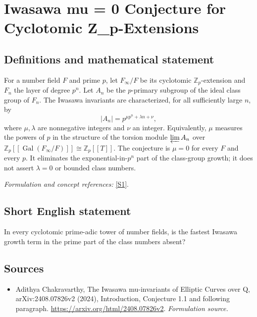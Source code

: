 \documentclass[11pt]{article}
\begin{document}
\section*{\texorpdfstring{Iwasawa mu = 0 Conjecture for Cyclotomic Z\_p-Extensions}{Iwasawa mu = 0 Conjecture for Cyclotomic Z\_p-Extensions}}\label{324}
\subsection{Definitions and mathematical statement}
For a number field $F$ and prime $p$, let $F_\infty/F$ be its cyclotomic ${\mathbb{Z}}_p$-extension and $F_n$ the layer of degree $p^n$. Let $A_n$ be the $p$-primary subgroup of the ideal class group of $F_n$. The Iwasawa invariants are characterized, for all sufficiently large $n$, by
\[
 |A_n|=p^{\mu p^n+\lambda n+\nu},
\]
where $\mu,\lambda$ are nonnegative integers and $\nu$ an integer. Equivalently, $\mu$ measures the powers of $p$ in the structure of the torsion module $\varprojlim A_n$ over ${\mathbb{Z}}_p[[\operatorname{Gal}(F_\infty/F)]]\cong{\mathbb{Z}}_p[[T]]$. The conjecture is $\mu=0$ for every $F$ and every $p$. It eliminates the exponential-in-$p^n$ part of the class-group growth; it does not assert $\lambda=0$ or bounded class numbers.
\par\smallskip\textit{Formulation and concept references:} \href{https://arxiv.org/html/2408.07826v2}{[S1]}.

\subsection{Short English statement}
In every cyclotomic prime-adic tower of number fields, is the fastest Iwasawa growth term in the prime part of the class numbers absent?
\subsection{Sources}
\begin{itemize}
\item[S1]Adithya Chakravarthy, The Iwasawa mu-invariants of Elliptic Curves over Q, arXiv:2408.07826v2 (2024), Introduction, Conjecture 1.1 and following paragraph.
\url{https://arxiv.org/html/2408.07826v2}.
\textit{Formulation source.}
\end{itemize}
\end{document}
